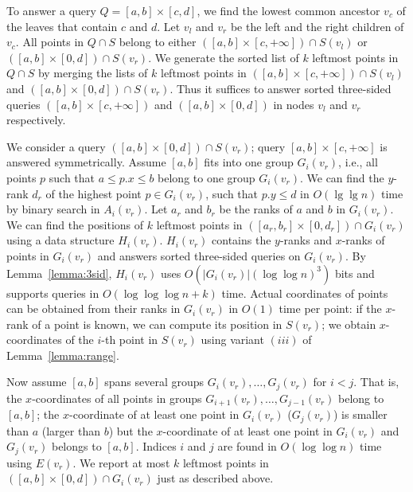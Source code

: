 \documentclass[11pt]{article}
\begin{document}
To answer a query $Q=[a,b]\times [c,d]$, we find the lowest common
ancestor $v_c$ of the leaves that contain $c$ and $d$.  Let $v_l$ and
$v_r$ be the left and the right children of $v_c$.  All points in
$Q\cap S$ belong to either $([a,b]\times [c,+\infty])\cap S(v_l)$ or
$([a,b]\times [0,d])\cap S(v_r)$.  We generate the sorted list of $k$
leftmost points in $Q\cap S$ by merging the lists of $k$ leftmost
points in $([a,b]\times [c,+\infty])\cap S(v_l)$ and $([a,b]\times
[0,d])\cap S(v_r)$. Thus it suffices to answer sorted three-sided
queries $([a,b]\times [c,+\infty])$ and $([a,b]\times [0,d])$ in nodes
$v_l$ and $v_r$ respectively.

We consider a query $([a,b]\times [0,d])\cap S(v_r)$; query $[a,b]\times [c,+\infty]$ is answered symmetrically. Assume
$[a,b]$ fits into one group $G_i(v_r)$, i.e., all points $p$ such that
$a\le p.x\le b$ belong to one group $G_i(v_r)$.  We can find the
$y$-rank $d_r$ of the highest point $p\in G_i(v_r)$, such that $p.y
\leq d$ in $O(\lg \lg n)$ time by binary search in $A_i(v_r)$.  Let $a_r$
and $b_r$ be the ranks of $a$ and $b$ in $G_i(v_r)$.  We can find the
positions of $k$ leftmost points in $([a_r,b_r]\times [0,d_r])\cap
G_i(v_r)$ using a data structure $H_i(v_r)$.
$H_i(v_r)$ contains the $y$-ranks and $x$-ranks of points in $G_i(v_r)$ 
and answers sorted three-sided queries on $G_i(v_r)$. 
By Lemma~\ref{lemma:3sid}, $H_i(v_r)$ uses $O(|G_i(v_r)|(\log \log n)^3)$ bits 
and supports  queries in $O(\log \log \log n + k )$ time.
 Actual coordinates of points can be obtained from their ranks in $G_i(v_r)$ in  $O(1)$ time per point: if the $x$-rank of a point 
is known, we can compute its position in $S(v_r)$; we obtain 
$x$-coordinates of the $i$-th point in $S(v_r)$ using variant 
$(iii)$ of Lemma~\ref{lemma:range}.

Now assume $[a,b]$ spans several groups $G_i(v_r),\ldots,G_j(v_r)$
for $i<j$. That is, the $x$-coordinates of all points in groups
$G_{i+1}(v_r),\ldots,G_{j-1}(v_r)$ belong to $[a,b]$; the
$x$-coordinate of at least one point in $G_i(v_r)$ ($G_j(v_r)$) is
smaller than $a$ (larger than $b$) but the $x$-coordinate of at least
one point in $G_i(v_r)$ and $G_j(v_r)$ belongs to $[a,b]$. Indices $i$ and 
$j$ are found in $O(\log \log n)$ time using $E(v_r)$.  We report
at most $k$ leftmost points in $([a,b]\times [0,d])\cap G_i(v_r)$
just as described above.
\end{document}
